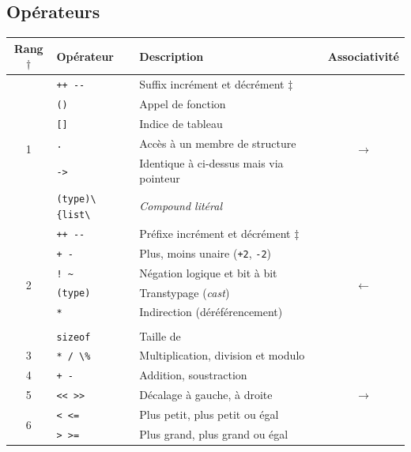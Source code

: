 \documentclass{article}
\newcommand{\cd}{\lstinline}
\begin{document}
\begin{multicols*}{3}
\section*{Opérateurs}

\begin{tabularx}{\linewidth}{c|l|X|c}
  \bf Rang$\dagger$ & \bf Opérateur & \bf Description & \bf Associativité \\
  \hline
  \multirow{6}{*}{1} & \cd{++ --}  & Suffix incrément et décrément $\ddagger$ & \multirow{6}{*}{$\rightarrow$} \\
                     & \cd{()}     & Appel de fonction                     & \\
                     & \cd{[]}     & Indice de tableau                     & \\
                     & \cd{.}      & Accès à un membre de structure        & \\
                     & \cd{->}     & Identique à ci-dessus mais via pointeur & \\
                     & \cd{(type)\{list\}} & \emph{Compound litéral} & \\
  \hline
  \multirow{7}{*}{2} & \cd{++ --}  & Préfixe incrément et décrément $\ddagger$ & \multirow{7}{*}{$\leftarrow$} \\
                     & \cd{+ -}    & Plus, moins unaire (\cd{+2}, \cd{-2}) & \\
                     & \cd{! ~}    & Négation logique et bit à bit & \\
                     & \cd{(type)} & Transtypage (\emph{cast}) & \\
                     & \cd{*}      & Indirection (déréférencement) & \\
                     & \cd{&}      & Adresse de & \\
                     & \cd{sizeof} & Taille de & \\
  \hline
  3                  & \cd{* / \%}  & Multiplication, division et modulo & \multirow{11}{*}{$\rightarrow$} \\
  \cline{1-3}
  4                  & \cd{+ -}    & Addition, soustraction & \\
  \cline{1-3}
  5                  & \cd{<< >>}  & Décalage à gauche, à droite & \\
  \cline{1-3}
  \multirow{2}{*}{6}  & \cd{< <=}   & Plus petit, plus petit ou égal & \\
                     & \cd{> >=}   & Plus grand, plus grand ou égal & \\

\end{tabularx}
\end{multicols*}
\end{document}
